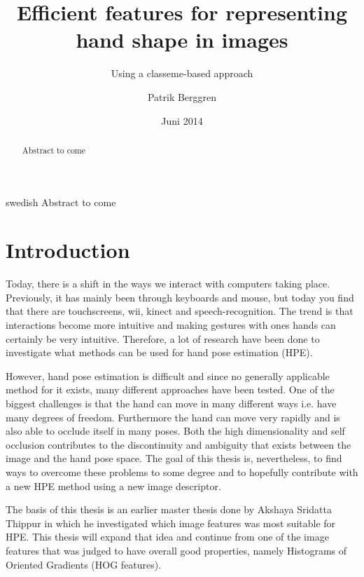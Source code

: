 \documentclass[a4paper,11pt]{kth-mag}
\title{Efficient features for representing hand shape in images}
\subtitle{Using a classeme-based approach}
\author{Patrik Berggren}
\date{Juni 2014}
\begin{document}
\frontmatter
\pagestyle{empty}
\removepagenumbers
\maketitle
{}



\begin{abstract}
Abstract to come
\end{abstract}
\clearpage
\begin{foreignabstract}{swedish}
Abstract to come
\end{foreignabstract}
\clearpage
\tableofcontents*
\mainmatter
\pagestyle{newchap}

\section{Introduction}
Today, there is a shift in the ways we interact with computers taking place.
Previously, it has mainly been through keyboards and mouse, but today you find that there are touchscreens, wii, kinect and speech-recognition.
The trend is that interactions become more intuitive and making gestures with ones hands can certainly be very intuitive.
Therefore, a lot of research have been done to investigate what methods can be used for hand pose estimation (HPE).

However, hand pose estimation is difficult and since no generally applicable method for it exists, many different approaches have been tested.
One of the biggest challenges is that the hand can move in many different ways i.e. have many degrees of freedom.
Furthermore the hand can move very rapidly and is also able to occlude itself in many poses.
Both the high dimensionality and self occlusion contributes to the discontinuity and ambiguity that exists between the image and the hand pose space.
The goal of this thesis is, nevertheless, to find ways to overcome these problems to some degree and to hopefully contribute with a new HPE method using a new image descriptor.

The basis of this thesis is an earlier master thesis done by Akshaya Sridatta Thippur \cite{akshayaMaster} in which he investigated which image features was most suitable for HPE.
This thesis will expand that idea and continue from one of the image features that was judged to have overall good properties, namely Histograms of Oriented Gradients (HOG features).
 
\end{document}
